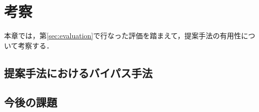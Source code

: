\section{考察}
本章では，第\ref{sec:evaluation}で行なった評価を踏まえて，提案手法の有用性について考察する．

\subsection{提案手法におけるバイパス手法}
\subsection{今後の課題}


